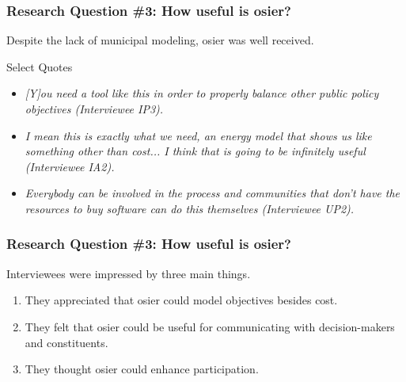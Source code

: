 \begin{frame}
    \frametitle{Research Question \#3: How useful is \gls{osier}?}

    Despite the lack of municipal modeling, \gls{osier} was well received.

    \begin{block}{Select Quotes}
        \begin{itemize}
            \item   \textit{[Y]ou need a tool like this in order to properly balance other
                        public policy objectives (Interviewee IP3).}  
            \item \textit{I mean this is exactly what we need, an energy model that shows us
                        like something other than cost... I think that is going to be infinitely
                        useful (Interviewee IA2).}
            \item \textit{Everybody can be involved in the process and communities that don’t
                        have the resources to buy software can do this themselves (Interviewee UP2).}
        \end{itemize}
    \end{block}
\end{frame}

\begin{frame}
    \frametitle{Research Question \#3: How useful is \gls{osier}?}
    Interviewees were impressed by three main things. 
    \begin{enumerate}[<+->]
        \item They appreciated that \gls{osier} could model objectives besides cost.
        \item They felt that \gls{osier} could be useful for communicating with decision-makers and constituents.
        \item They thought \gls{osier} could enhance participation.
    \end{enumerate}
    
\end{frame}

